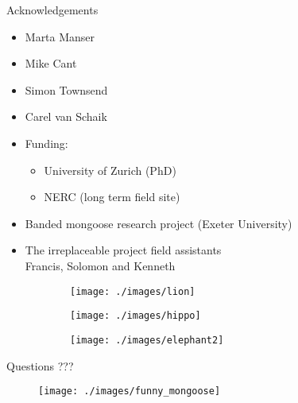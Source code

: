 \documentclass[xcolor=dvipsnames]{beamer}
\begin{document}
\begin{frame}[plain]{Acknowledgements}
\begin{itemize}
\item Marta Manser
\item Mike Cant
\item Simon Townsend
\item Carel van Schaik
\end{itemize}

\begin{itemize}
\item Funding:
\begin{itemize}
\item University of Zurich (PhD)  
\item NERC (long term field site)
\end{itemize}
\end{itemize}

\begin{itemize}
\item Banded mongoose research project (Exeter University)
\item The irreplaceable project field assistants \\Francis, Solomon and Kenneth 
\end{itemize}
\begin{figure}
  \centering
\centering
\begin{subfigure}{.3\textwidth}
\centering
\texttt{[image: ./images/lion]}
\end{subfigure}\quad
\centering
\begin{subfigure}{.3\textwidth}
\centering
\texttt{[image: ./images/hippo]}
\end{subfigure}\quad
\begin{subfigure}{.3\textwidth}
\centering
\texttt{[image: ./images/elephant2]}
\end{subfigure}
\end{figure}
\end{frame}
   \begin{frame}
\begin{center}
{\Large Questions ???}
\end{center}


\begin{figure}
\centering
\texttt{[image: ./images/funny\_mongoose]}
\end{figure}

   \end{frame}
   
   
   
   
\end{document}
